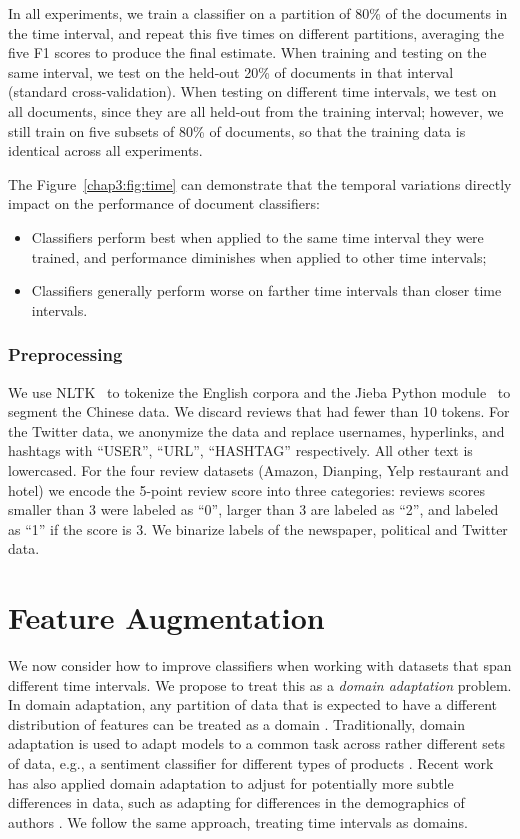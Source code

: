In all experiments, we train a classifier on a partition of 80\% of the documents in the time interval, and repeat this five times on different partitions, averaging the five F1 scores to produce the final estimate. When training and testing on the same interval, we test on the held-out 20\% of documents in that interval (standard cross-validation).
When testing on different time intervals, we test on all documents, since they are all held-out from the training interval; however, we still train on five subsets of 80\% of documents, so that the training data is identical across all experiments.

The Figure~\ref{chap3:fig:time} can demonstrate that the temporal variations directly impact on the performance of document classifiers: 
\begin{itemize}
    \item Classifiers perform best when applied to the same time interval they were trained, and performance diminishes when applied to other time intervals;
    \item Classifiers generally perform worse on farther time intervals than closer time intervals.
\end{itemize}

\subsubsection{Preprocessing}
%
We use NLTK~\cite{bird2004nltk} to tokenize the English corpora and the Jieba Python module~\cite{sun2012jieba} to segment the Chinese data. 
We discard reviews that had fewer than 10 tokens. 
For the Twitter data, we anonymize the data and replace usernames, hyperlinks, and hashtags with ``USER'', ``URL'', ``HASHTAG'' respectively. 
All other text is lowercased.
For the four review datasets (Amazon, Dianping, Yelp restaurant and hotel) we encode the 5-point review score into three categories: reviews scores smaller than 3 were labeled as ``0'', larger than 3 are labeled as ``2'', and labeled as ``1'' if the score is 3. We binarize labels of the newspaper, political and Twitter data. 


\section{Feature Augmentation}
\label{chap3:sec:fa}

We now consider how to improve classifiers when working with datasets that span different time intervals.
We propose to treat this as a {\em domain adaptation} problem.
In domain adaptation, any partition of data that is expected to have a different distribution of features can be treated as a domain \cite{joshi2013s}.
Traditionally, domain adaptation is used to adapt models to a common task across rather different sets of data, e.g., a sentiment classifier for different types of products \cite{blitzer-07}.
Recent work has also applied domain adaptation to adjust for potentially more subtle differences in data, such as adapting for differences in the demographics of authors \cite{volkova2013exploring, lynn2017human}.
We follow the same approach, treating time intervals as domains.

